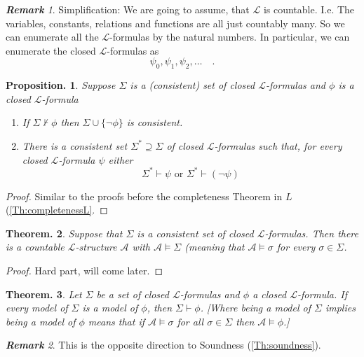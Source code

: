 \documentclass[a4paper,oneside,11pt,DIV=12,parskip=half]{scrartcl}
\newcommand{\LL}{\mathcal L}
\newcommand{\A}{\mathcal A}
\theoremstyle{plain}
\newtheorem{theorem}{Theorem.}[section]
\newtheorem{proposition}[theorem]{Proposition.}
\theoremstyle{definition}
\newtheorem{remark, definition}[theorem]{Remark and Definition.}
\newtheorem{lemma, definition}[theorem]{Lemma and Definition.}
\newtheorem{theorem, definition}[theorem]{Theorem and Definition.}
\theoremstyle{remark}
\newtheorem*{remark}{\textbf{Remark}}
\newtheorem*{remark, example}{\textbf{Remark and Exercise}}
\begin{document}
\begin{remark}
Simplification: We are going to assume, that $\LL$ is countable. I.e. The variables, constants, relations and functions are all just countably many. So we can enumerate all the $\LL$-formulas by the natural numbers. In particular, we can enumerate the closed $\LL$-formulas as
    \[ \psi_0, \psi_1, \psi_2, \dots \quad. \]
\end{remark}

\begin{proposition}
Suppose $\Sigma$ is a (consistent) set of closed $\LL$-formulas and $\phi$ is a closed $\LL$-formula
\begin{enumerate}
    \item If $\Sigma \not \vdash \phi$ then $\Sigma \cup \{\lnot \phi \}$ is consistent. 
    \item There is a consistent set $\Sigma^* \supseteq \Sigma$ of closed $\LL$-formulas such that, for every closed $\LL$-formula $\psi$ either
        \[ \Sigma^* \vdash \psi \text{ or } \Sigma^* \vdash (\lnot \psi) \]
\end{enumerate}
\end{proposition}

\begin{proof}
Similar to the proofs before the completeness Theorem in $L$ (\ref{Th:completenessL}.
\end{proof}

\begin{theorem}\label{Th:structure_compl}
Suppose that $\Sigma$ is a consistent set of closed $\LL$-formulas. Then there is a countable $\LL$-structure $\A$ with $\A \vDash \Sigma$ (meaning that $\A \vDash \sigma$ for every $\sigma \in \Sigma$.
\end{theorem}

\begin{proof}
Hard part, will come later.
\end{proof}

\begin{theorem}\label{Th:inverseSoundness}
Let $\Sigma$ be a set of closed $\LL$-formulas and $\phi$ a closed $\LL$-formula. If every model of $\Sigma$ is a model of $\phi$, then $\Sigma \vdash \phi$. [Where \emph{being a model of $\Sigma$ implies being a model of $\phi$} means that if $\A \vDash \sigma$ for all $\sigma \in \Sigma$ then $\A \vDash \phi$.]
\end{theorem}

\begin{remark}
This is the opposite direction to Soundness (\ref{Th:soundness}).
\end{remark}
\end{document}
